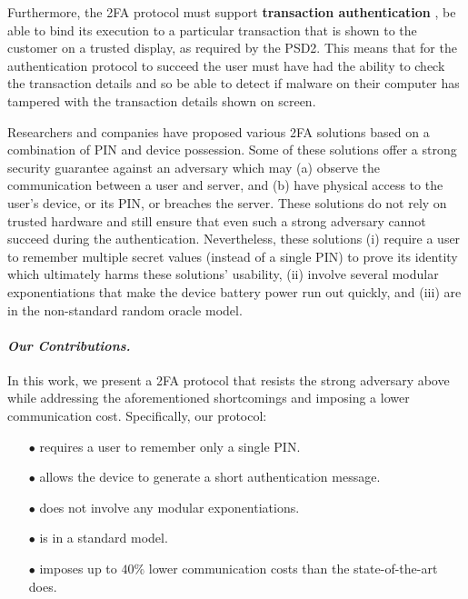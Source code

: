 Furthermore, the 2FA protocol must support \textbf{transaction authentication} \ie, be able to bind its execution to a particular transaction that is shown to the customer on a trusted display, as required by the PSD2.
This means that for the authentication protocol to succeed the user must have had the ability to check the transaction details and so be able to detect if malware on their computer has tampered with the transaction details shown on screen.

Researchers and companies have proposed various 2FA solutions based on a combination of PIN and device possession. Some of these solutions offer a strong security guarantee against an adversary which may (a) observe the communication between a user and server, and (b) have physical access to the user's device, or its PIN, or breaches the server. These solutions do not rely on trusted hardware and still ensure that even such a strong adversary cannot succeed during the authentication. Nevertheless, these solutions (i) require a user to remember multiple secret values (instead of a single PIN)  to prove its identity which ultimately harms these solutions' usability, (ii) involve several modular exponentiations that make the device battery power run out quickly, and (iii) are in the non-standard random oracle model.

\paragraph{\textbf{\textit{Our Contributions.}}}  In this work, we present a 2FA protocol that resists the strong adversary above while addressing the aforementioned shortcomings and imposing a lower communication cost. Specifically, our protocol:

\begin{itemize}
\item[$\bullet$] requires a user to remember only a single PIN.

\item[$\bullet$] {allows the device to generate a short authentication message.} 

\item[$\bullet$] does not involve any modular exponentiations.

\item[$\bullet$] is in a standard model.

\item[$\bullet$]  imposes up to $40\%$ lower communication costs than the state-of-the-art does. 


\end{itemize}

